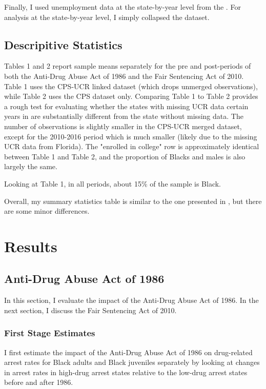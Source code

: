 \documentclass{article}
\begin{document}
Finally, I used unemployment data at the state-by-year level from the \cite{unemployment_data}. For analysis at the state-by-year level, I simply collapsed the dataset.

\subsection{Descripitive Statistics}

Tables 1 and 2 report sample means separately for the pre and post-periods of both the Anti-Drug Abuse Act of 1986 and the Fair Sentencing Act of 2010. Table 1 uses the CPS-UCR linked dataset (which drops unmerged observations), while Table 2 uses the CPS dataset only. Comparing Table 1 to Table 2 provides a rough test for evaluating whether the states with missing UCR data certain years in are substantially different from the state without missing data. The number of observations is slightly smaller in the CPS-UCR merged dataset, except for the 2010-2016 period which is much smaller (likely due to the missing UCR data from Florida). The "enrolled in college" row is approximately identical between Table 1 and Table 2, and the proportion of Blacks and males is also largely the same.

Looking at Table 1, in all periods, about 15\% of the sample is Black.

Overall, my summary statistics table is similar to the one presented in \cite{britton2022}, but there are some minor differences.

\section{Results}

\subsection{Anti-Drug Abuse Act of 1986}

In this section, I evaluate the impact of the Anti-Drug Abuse Act of 1986. In the next section, I discuss the Fair Sentencing Act of 2010.

\subsubsection{First Stage Estimates}

I first estimate the impact of the Anti-Drug Abuse Act of 1986 on drug-related arrest rates for Black adults and Black juveniles separately by looking at changes in arrest rates in high-drug arrest states relative to the low-drug arrest states before and after 1986.
\end{document}
